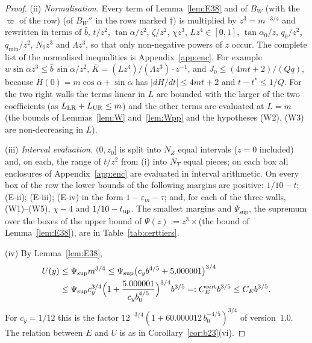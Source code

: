 \documentclass[11pt]{amsart}
\newcommand{\ca}{\cos\alpha}
\newcommand{\sa}{\sin\alpha}
\newcommand{\ta}{\tan\alpha}
\newcommand{\taz}{\tan\alpha_0}
\newcommand{\Kb}{\bar K}
\theoremstyle{definition}
\theoremstyle{remark}
\numberwithin{equation}{section}
\begin{document}
\begin{proof}
(ii) \emph{Normalisation.} Every term of Lemma~\ref{lem:E38} and of $B_W$ (with the $\varpi$ of the row)
(of $B_W''$ in the rows marked $\dagger$)
is multiplied by $z^3=m^{-3/4}$ and rewritten in terms of $\hat b$, $t/z^2$, $\ta/z^2$,
$\zeta/z^2$, $\chi z^3$, $Lz^4\in[0,1]$, $\taz/z$, $q_0/z^2$, $q_{\min}/z^2$, $N_0z^3$ and $\Lambda z^3$, so that only
non-negative powers of $z$ occur. The complete list of the normalised inequalities is Appendix~\ref{app:enc}. For example
$w\sa z^3\le\hat b\,\sa/z^2$, $\Kb=(Lz^4)/(\Lambda z^3)\cdot z^{-1}$, and $J_0\le(4mt+2)/(Qq)$, because
$H(0)=m\ca+\sa$ has $|dH/dt|\le4mt+2$ and $t-t^*\le1/Q$. For the two right walls the terms linear in $L$ are bounded
with the larger of the two coefficients (as $L_{\rm LR}+L_{\rm UR}\le m$) and the other terms are evaluated at $L=m$
(the bounds of Lemmas~\ref{lem:W}
and~\ref{lem:Wpp}
and the hypotheses (W2), (W3) are non-decreasing in $L$).

(iii) \emph{Interval evaluation.} $(0,z_0]$ is split into $N_Z$ equal intervals ($z=0$ included) and, on each, the range
of $t/z^2$ from (i) into $N_T$ equal pieces; on each box all enclosures of Appendix~\ref{app:enc} are evaluated in
interval arithmetic. On every box of the row the lower bounds of the following margins are positive: $1/10-t$; (E-ii);
(E-iii); (E-iv) in the form $1-\varepsilon_m-\tau$; and, for each of the three walls, (W1)--(W5), $\chi-4$ and
$1/10-t_{\rm up}$. The smallest margins and $\Psi_{\sup}$, the supremum over the boxes of the upper bound of
$\Psi(z):=z^3\times$(the bound of Lemma~\ref{lem:E38}), are in Table~\ref{tab:certtiers}.

(iv) By Lemma~\ref{lem:E38},
\begin{align*}
U(y)&\le\Psi_{\sup}m^{3/4}\le\Psi_{\sup}\bigl(c_yb^{4/5}+5.000001\bigr)^{3/4}\\
&\le\Psi_{\sup}c_y^{3/4}\Bigl(1+\frac{5.000001}{c_yb_0^{4/5}}\Bigr)^{3/4}b^{3/5}=:C_E^{\rm cert}b^{3/5}\le C_Eb^{3/5}.
\end{align*}
For $c_y=1/12$ this is the factor $12^{-3/4}(1+60.000012\,b_0^{-4/5})^{3/4}$ of version~1.0. The relation between $E$ and
$U$ is as in Corollary~\ref{cor:b23}(vi).
\end{proof}
\end{document}
